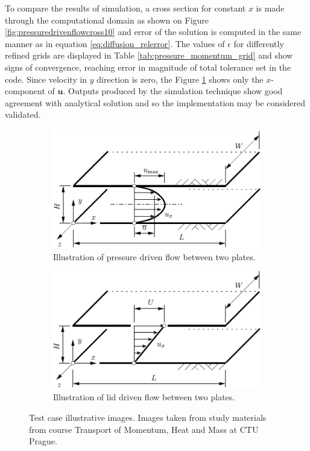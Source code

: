 \documentclass[]{article}
\begin{document}
To compare the results of simulation, a cross section for constant $ x $ is made through the computational domain as shown on Figure \ref{fig:pressuredrivenflowcross10} and error of the solution is computed in the same manner as in equation \ref{eq:diffusion_relerror}. The values of $ \epsilon $ for differently refined grids are displayed in Table \ref{tab:pressure_momentum_grid} and show signs of convergence, reaching error in magnitude of total tolerance set in the code. Since velocity in $ y $ direction is zero, the Figure \ref{fig:pressuredrivenflow} shows only the $ x $-component of $ \mathbf{u} $. Outputs produced by the simulation technique show good agreement with analytical solution and so the implementation may be considered validated.

\begin{figure}
	\centering
	\begin{subfigure}{.49\textwidth}
		\centering
		\includegraphics[width=1\linewidth]{figs/pressure_driven_flow}
		\caption{Illustration of pressure driven flow between two plates.}
		\label{fig:pressuredrivenflow}
	\end{subfigure}
	\begin{subfigure}{.49\textwidth}
		\centering
		\includegraphics[width=1\linewidth]{figs/lid_driven_flow}
		\caption{Illustration of lid driven flow between two plates.}
		\label{fig:liddrivenflow}
	\end{subfigure}
	\caption{Test case illustrative images. Images taken from study materials from course Transport of Momentum, Heat and Mass at CTU Prague.}
	\label{fig:pressure_and_lid_driven_ilustartion}
\end{figure}
\end{document}
